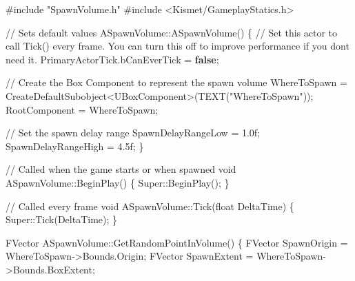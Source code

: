 \documentclass[
  letterpaper,
  DIV=11,
  numbers=noendperiod]{scrartcl}
\newenvironment{Shaded}{\begin{snugshade}}{\end{snugshade}}
\newcommand{\BuiltInTok}[1]{\textcolor[rgb]{0.00,0.23,0.31}{#1}}
\newcommand{\CommentTok}[1]{\textcolor[rgb]{0.37,0.37,0.37}{#1}}
\newcommand{\DataTypeTok}[1]{\textcolor[rgb]{0.68,0.00,0.00}{#1}}
\newcommand{\FloatTok}[1]{\textcolor[rgb]{0.68,0.00,0.00}{#1}}
\newcommand{\ImportTok}[1]{\textcolor[rgb]{0.00,0.46,0.62}{#1}}
\newcommand{\KeywordTok}[1]{\textcolor[rgb]{0.00,0.23,0.31}{\textbf{#1}}}
\newcommand{\NormalTok}[1]{\textcolor[rgb]{0.00,0.23,0.31}{#1}}
\newcommand{\OperatorTok}[1]{\textcolor[rgb]{0.37,0.37,0.37}{#1}}
\newcommand{\PreprocessorTok}[1]{\textcolor[rgb]{0.68,0.00,0.00}{#1}}
\newcommand{\StringTok}[1]{\textcolor[rgb]{0.13,0.47,0.30}{#1}}
\begin{document}
\begin{Shaded}
\begin{Highlighting}[]
\PreprocessorTok{\#include }\ImportTok{"SpawnVolume.h"}
\PreprocessorTok{\#include }\ImportTok{\textless{}Kismet/GameplayStatics.h\textgreater{}}

\CommentTok{// Sets default values}
\NormalTok{ASpawnVolume}\OperatorTok{::}\NormalTok{ASpawnVolume}\OperatorTok{()}
\OperatorTok{\{}
    \CommentTok{// Set this actor to call Tick() every frame. You can turn this off to improve performance if you don\textquotesingle{}t need it.}
\NormalTok{    PrimaryActorTick}\OperatorTok{.}\NormalTok{bCanEverTick }\OperatorTok{=} \KeywordTok{false}\OperatorTok{;}
    
    \CommentTok{// Create the Box Component to represent the spawn volume}
\NormalTok{    WhereToSpawn }\OperatorTok{=}\NormalTok{ CreateDefaultSubobject}\OperatorTok{\textless{}}\NormalTok{UBoxComponent}\OperatorTok{\textgreater{}(}\NormalTok{TEXT}\OperatorTok{(}\StringTok{"WhereToSpawn"}\OperatorTok{));}
\NormalTok{    RootComponent }\OperatorTok{=}\NormalTok{ WhereToSpawn}\OperatorTok{;}
    
    \CommentTok{// Set the spawn delay range}
\NormalTok{    SpawnDelayRangeLow }\OperatorTok{=} \FloatTok{1.0}\BuiltInTok{f}\OperatorTok{;}
\NormalTok{    SpawnDelayRangeHigh }\OperatorTok{=} \FloatTok{4.5}\BuiltInTok{f}\OperatorTok{;}
\OperatorTok{\}}

\CommentTok{// Called when the game starts or when spawned}
\DataTypeTok{void}\NormalTok{ ASpawnVolume}\OperatorTok{::}\NormalTok{BeginPlay}\OperatorTok{()}
\OperatorTok{\{}
\NormalTok{    Super}\OperatorTok{::}\NormalTok{BeginPlay}\OperatorTok{();}
\OperatorTok{\}}

\CommentTok{// Called every frame}
\DataTypeTok{void}\NormalTok{ ASpawnVolume}\OperatorTok{::}\NormalTok{Tick}\OperatorTok{(}\DataTypeTok{float}\NormalTok{ DeltaTime}\OperatorTok{)}
\OperatorTok{\{}
\NormalTok{    Super}\OperatorTok{::}\NormalTok{Tick}\OperatorTok{(}\NormalTok{DeltaTime}\OperatorTok{);}
\OperatorTok{\}}

\NormalTok{FVector ASpawnVolume}\OperatorTok{::}\NormalTok{GetRandomPointInVolume}\OperatorTok{()}
\OperatorTok{\{}
\NormalTok{    FVector SpawnOrigin }\OperatorTok{=}\NormalTok{ WhereToSpawn}\OperatorTok{{-}\textgreater{}}\NormalTok{Bounds}\OperatorTok{.}\NormalTok{Origin}\OperatorTok{;}
\NormalTok{    FVector SpawnExtent }\OperatorTok{=}\NormalTok{ WhereToSpawn}\OperatorTok{{-}\textgreater{}}\NormalTok{Bounds}\OperatorTok{.}\NormalTok{BoxExtent}\OperatorTok{;}
    

\end{Highlighting}
\end{Shaded}
\end{document}
